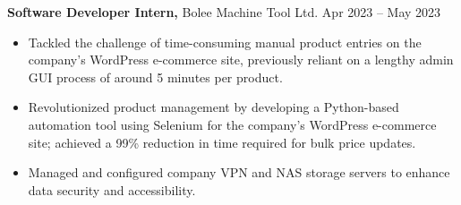 \textbf{Software Developer Intern,} {Bolee Machine Tool Ltd.}  \hfill Apr 2023 -- May 2023 \\
\vspace{-9pt}
\begin{itemize}
  \item Tackled the challenge of time-consuming manual product entries on the company’s WordPress e-commerce site, previously reliant on a lengthy admin GUI process of around 5 minutes per product.
  \item Revolutionized product management by developing a Python-based automation tool using Selenium for the company’s WordPress e-commerce site; achieved a 99\% reduction in time required for bulk price updates.
  \item Managed and configured company VPN and NAS storage servers to enhance data security and accessibility.
\end{itemize}